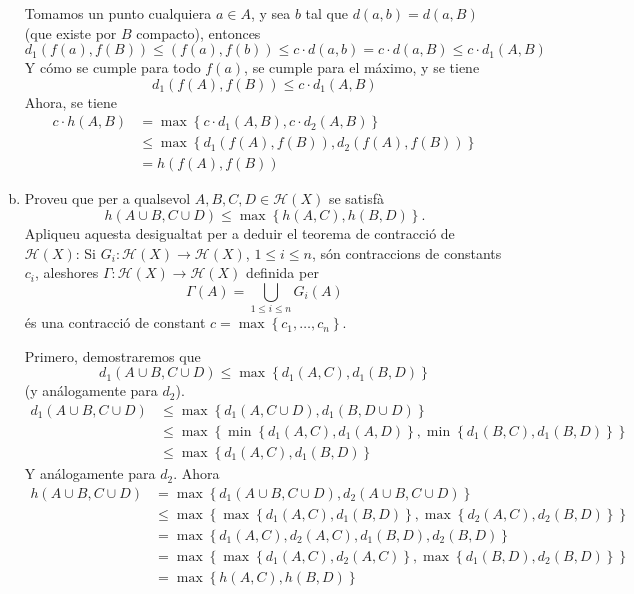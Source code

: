 \documentclass[12pt]{article}
\newcommand{\h}{\mathscr{H}}
\newcommand\setb[1]{\left\{#1\right\}}
\theoremstyle{break}
\begin{document}
\begin{enumerate}[a)]
	Tomamos un punto cualquiera $a \in A$, y sea $b$ tal que
	$d(a, b) = d(a, B)$ (que existe por $B$ compacto), entonces
	\[
		d_1\left( f(a), f(B) \right) \leq \left( f(a), f(b) \right)
		\leq c \cdot d(a, b) = c \cdot d(a, B) \leq c \cdot d_1(A,
		B)
	\]
	Y cómo se cumple para todo $f(a)$, se cumple para el máximo,
	y se tiene
	\[
		d_1\left( f(A), f(B) \right) \leq c \cdot d_1(A, B)
	\]
	Ahora, se tiene
	\[
		\begin{aligned}
			c \cdot h(A, B) &= \max \setb{ c \cdot d_1(A, B), c \cdot d_2(A, B) } \\
			&\leq \max \setb{ d_1\left( f(A), f(B) \right), d_2\left( f(A), f(B) \right) } \\
			&= h\left( f(A), f(B) \right)
		\end{aligned}
	\]
\item Proveu que per a qualsevol $A, B, C, D \in \h(X)$
	se satisfà
	\[
		h\left( A \cup B, C \cup D \right) \leq \max \setb{ h(A,
		C), h(B, D) }.
	\]
	Apliqueu aquesta desigualtat per a deduir el teorema de
	contracció de $\h(X)$: Si $G_i \colon \h(X) \to \h(X)$,
	$1 \leq i \leq n$, són contraccions de constants $c_i$,
	aleshores $\Gamma \colon \h(X) \to \h(X)$ definida per
	\[
		\Gamma(A) = \bigcup_{1 \leq i \leq n} G_i(A)
	\]
	és una contracció de constant
	$c = \max \setb{ c_1, \dots, c_n }$.

	\quad

	Primero, demostraremos que
	\[
		d_1(A \cup B, C \cup D) \leq \max \setb{ d_1(A, C), d_1(B, D) }
	\]
	(y análogamente para $d_2$).
	\[
		\begin{aligned}
			d_1(A \cup B, C \cup D) &\leq \max \setb{ d_1(A, C \cup D), d_1(B, D \cup D) } \\
			&\leq \max \setb{ \min \setb{d_1(A, C), d_1(A, D)}, \min \setb{d_1(B, C), d_1(B, D)}} \\
			&\leq \max \setb{ d_1(A, C), d_1(B, D)}
		\end{aligned}
	\]
	Y análogamente para $d_2$. Ahora
	\[
		\begin{aligned}
			h(A \cup B, C \cup D) &= \max \setb{d_1(A \cup B, C \cup D), d_2(A \cup B, C \cup D)} \\
			&\leq \max \setb{\max \setb{d_1(A, C), d_1(B, D)}, \max \setb{d_2(A, C), d_2(B, D)}} \\
			&= \max \setb{ d_1(A, C), d_2(A, C), d_1(B, D), d_2(B, D)} \\
			&= \max \setb{ \max \setb{d_1(A, C), d_2(A, C)}, \max \setb{d_1(B, D), d_2(B, D)}} \\
			&= \max \setb{ h(A, C), h(B, D) }
		\end{aligned}
	\]


\end{enumerate}
\end{document}
